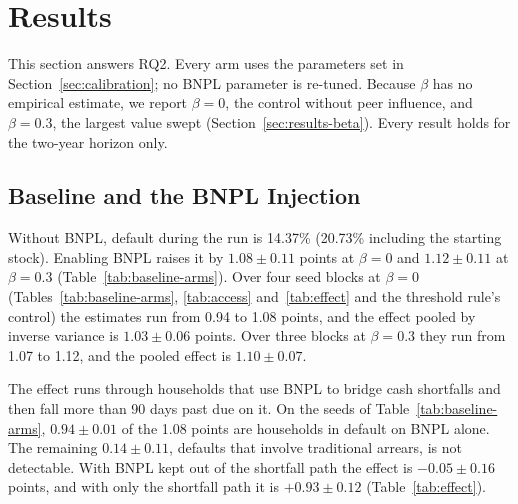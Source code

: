 \section{Results}
\label{sec:results}

This section answers RQ2. Every arm uses the parameters set in
Section~\ref{sec:calibration}; no \ac{BNPL} parameter is re-tuned.
Because $\beta$ has no empirical estimate, we report $\beta=0$, the control without peer
influence, and $\beta=0.3$, the largest value swept (Section~\ref{sec:results-beta}). Every
result holds for the two-year horizon only.

\subsection{Baseline and the BNPL Injection}
\label{sec:results-injection}

Without \ac{BNPL}, default during the run is 14.37\% (20.73\% including the starting stock).
Enabling \ac{BNPL} raises it by $1.08 \pm 0.11$ points at $\beta=0$ and $1.12 \pm 0.11$ at
$\beta=0.3$ (Table~\ref{tab:baseline-arms}). Over four seed blocks at $\beta=0$
(Tables~\ref{tab:baseline-arms}, \ref{tab:access} and~\ref{tab:effect} and the threshold rule's
control) the estimates run from 0.94 to 1.08 points, and the effect pooled by inverse variance
is $1.03 \pm 0.06$ points. Over three blocks at $\beta=0.3$ they run from 1.07 to 1.12, and the
pooled effect is $1.10 \pm 0.07$.



The effect runs through households that use \ac{BNPL} to bridge cash shortfalls and then fall
more than 90 days past due on it. On the seeds of Table~\ref{tab:baseline-arms}, $0.94 \pm 0.01$ of the 1.08
points are households in default on \ac{BNPL} alone. The remaining $0.14 \pm 0.11$, defaults that
involve traditional arrears, is not detectable.
With \ac{BNPL} kept out of the shortfall path the effect is $-0.05 \pm 0.16$ points, and with
only the shortfall path it is $+0.93 \pm 0.12$ (Table~\ref{tab:effect}).

